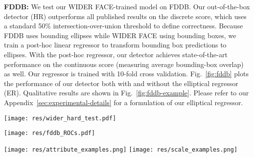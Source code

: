 \documentclass[10pt,twocolumn,letterpaper]{article}
\begin{document}
{\bf FDDB:} We test our WIDER FACE-trained model on FDDB. Our out-of-the-box detector (HR) outperforms all published results on the discrete score, which uses a standard 50\% intersection-over-union threshold to define correctness. Because FDDB uses bounding ellipses while WIDER FACE using bounding boxes, we train a post-hoc linear regressor to transform bounding box predictions to ellipses. With the post-hoc regressor, our detector achieves state-of-the-art performance on the continuous score (measuring average bounding-box overlap) as well. Our regressor is trained with 10-fold cross validation. Fig.~\ref{fig:fddb} plots the performance of our detector both with and without the elliptical regressor (ER). Qualitative results are shown in Fig.~\ref{fig:fddb-example}. Please refer to our Appendix~\ref{sec:experimental-details} for a formulation of our elliptical regressor.

\begin{figure*}
  \centering
  \begin{minipage}{.32\textwidth}
    \centering
    \texttt{[image: res/wider\_hard\_test.pdf]}
\label{fig:widerface}  
  \end{minipage} \hspace{1em}
  \begin{minipage}{.65\textwidth}
    \centering
\texttt{[image: res/fddb\_ROCs.pdf]}
    \label{fig:fddb}  
  \end{minipage}
\end{figure*}

\begin{figure*}
  \centering
  \texttt{[image: res/attribute\_examples.png]}
  \texttt{[image: res/scale\_examples.png]}
  \caption{Qualitative results on WIDER FACE. We visualize one example for each attribute and scale. Our proposed detector is able to detect faces at a continuous range of scales, while being robust to challenges such as expression, blur, illumination etc. Please zoom in to look for some very small detections. }
  \label{fig:wider-example}
\end{figure*}
\end{document}
